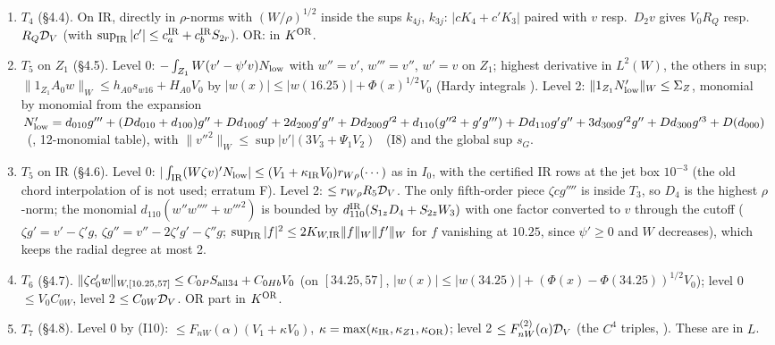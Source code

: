 \documentclass[11pt]{article}
\begin{document}
\begin{enumerate}[label=\textup{(\roman*)},leftmargin=2.2em]
\item $T_4$ (\S4.4). On IR, directly in $\rho$-norms with $(W/\rho)^{1/2}$ inside the sups $k_{4j}$, $k_{3j}$: $|cK_4+c'K_3|$ paired with $v$ resp.\ $D_2v$ gives $V_0R_Q$ resp.\ $R_Q\mathcal D_V$ (with $\sup_{\rm IR}|c'|\le c^{\rm IR}_a+c^{\rm IR}_bS_{2r}$). OR: in $K^{\mathrm{OR}}$.
\item $T_5$ on $Z_1$ (\S4.5). Level 0: $-\int_{Z_1}W(v'-\psi'v)N_{\rm low}$ with $w''=v'$, $w'''=v''$, $w'=v$ on $Z_1$; highest derivative in $L^2(W)$, the others in sup; $\|1_{Z_1}A_0w\|_W\le h_{A0}s_{w16}+H_{A0}V_0$ by $|w(x)|\le|w(16.25)|+\Phi(x)^{1/2}V_0$ (Hardy integrals ). Level 2: $\|1_{Z_1}N_{\rm low}'\|_W\le\Sigma_Z$, monomial by monomial from the expansion $N_{\rm low}'=d_{010}g'''+(Dd_{010}+d_{100})g''+Dd_{100}g'+2d_{200}g'g''+Dd_{200}g'^2+d_{110}(g''^2+g'g''')+Dd_{110}g'g''+3d_{300}g'^2g''+Dd_{300}g'^3+D(d_{000})$ \tS\ (, 12-monomial table), with $\|v''^2\|_W\le\sup|v'|(3V_3+\Psi_1V_2)$ \tS\ (I8) and the global sup $s_G$.
\item $T_5$ on IR (\S4.6). Level 0: $|\int_{\rm IR}(W\zeta v)'N_{\rm low}|\le(V_1+\kappa_{\rm IR}V_0)r_{W\rho}(\cdots)$ as in $I_0$, with the certified IR rows at the jet box $10^{-3}$ (the old chord interpolation of  is not used; erratum F). Level 2: $\le r_{W\rho}R_5\mathcal D_V$. The only fifth-order piece $\zeta cg''''$ is inside $T_3$, so $D_4$ is the highest $\rho$-norm; the monomial $d_{110}(w''w''''+w'''^2)$ is bounded by $d^{\rm IR}_{110}(S_{1z}D_4+S_{2z}W_3)$ with one factor converted to $v$ through the cutoff ($\zeta g'=v'-\zeta'g$, $\zeta g''=v''-2\zeta'g'-\zeta''g$; $\sup_{\rm IR}|f|^2\le2K_{W,\rm IR}\|f\|_W\|f'\|_W$ for $f$ vanishing at $10.25$, since $\psi'\ge0$ and $W$ decreases), which keeps the radial degree at most 2.
\item $T_6$ (\S4.7). $\|\zeta c_0'w\|_{W,[10.25,57]}\le C_{0P}S_{\rm all34}+C_{0Hb}V_0$ (on $[34.25,57]$, $|w(x)|\le|w(34.25)|+(\Phi(x)-\Phi(34.25))^{1/2}V_0$); level 0 $\le V_0C_{0W}$, level 2 $\le C_{0W}\mathcal D_V$. OR part in $K^{\mathrm{OR}}$.
\item $T_7$ (\S4.8). Level 0 by (I10): $\le F_{nW}(\alpha)(V_1+\kappa V_0)$, $\kappa=\max(\kappa_{\rm IR},\kappa_{Z1},\kappa_{\mathrm{OR}})$; level 2 $\le F^{(2)}_{nW}(\alpha)\mathcal D_V$ (the $C^4$ triples, ). These are in $L$.

\end{enumerate}
\end{document}
